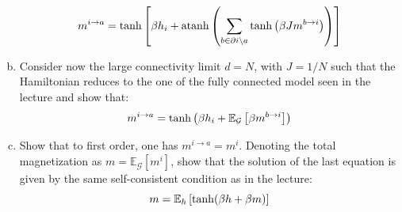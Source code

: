 \documentclass[a4paper,oneside,12pt]{article}
\begin{document}
\begin{enumerate}[(a)]
\begin{equation*}
            m^{i \to a} = \tanh \left\lbrack  \beta h_i + \operatorname{atanh} \left(  \sum_{b \in \partial i \setminus a} \tanh \left(  \beta J  m^{b \to i} \right)  \right)  \right\rbrack
        \end{equation*}
\item 
        Consider now the large connectivity limit $ d = N $, with $ J = 1/N $ such that the Hamiltonian reduces to the one of the fully connected model seen in the lecture and show that:
        \begin{equation*}
            m^{i \to a} = \tanh \left(  \beta h_i + \mathbb{E}_{\mathcal{G}} \left\lbrack  \beta m^{b \to i}  \right\rbrack  \right)
        \end{equation*}
\item 
        Show that to first order, one has $ m^{i \to a} = m^i $.
        Denoting the total magnetization as $ m = \mathbb{E}_{\mathcal{G}}[m^i] $, show that the solution of the last equation is given by the same self-consistent condition as in the lecture:
        \begin{equation*}
            m = \mathbb{E}_h \left\lbrack  \tanh(\beta h + \beta m)  \right\rbrack
        \end{equation*}
\end{enumerate}
\end{document}
